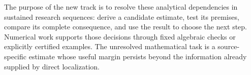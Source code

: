 The purpose of the new track is to resolve these analytical dependencies
in sustained research sequences: derive a candidate estimate, test its
premises, compare its complete consequence, and use the result to choose
the next step. Numerical work supports those decisions through fixed
algebraic checks or explicitly certified examples. The unresolved
mathematical task is a source-specific estimate whose useful margin
persists beyond the information already supplied by direct localization.
